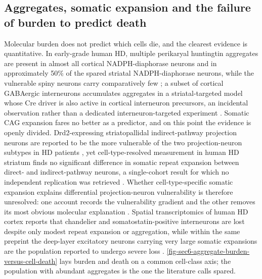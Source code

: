 \documentclass[11pt]{article}
\begin{document}
\subsection{Aggregates, somatic expansion and the failure of burden to predict death}
\label{sec-06-aggregates-expansion}

Molecular burden does not predict which cells die, and the clearest evidence is quantitative. In early-grade human HD, multiple perikaryal huntingtin aggregates are present in almost all cortical NADPH-diaphorase neurons and in approximately 50\% of the spared striatal NADPH-diaphorase neurons, while the vulnerable spiny neurons carry comparatively few \citep{Kuemmerle1999}; a subset of cortical GABAergic interneurons accumulates aggregates in a striatal-targeted model whose Cre driver is also active in cortical interneuron precursors, an incidental observation rather than a dedicated interneuron-targeted experiment \citep{Gu2007}. Somatic CAG expansion fares no better as a predictor, and on this point the evidence is openly divided. Drd2-expressing striatopallidal indirect-pathway projection neurons are reported to be the more vulnerable of the two projection-neuron subtypes in HD patients \citep{Lee2020}, yet cell-type-resolved measurement in human HD striatum finds no significant difference in somatic repeat expansion between direct- and indirect-pathway neurons, a single-cohort result for which no independent replication was retrieved \citep{Matlik2024}. Whether cell-type-specific somatic expansion explains differential projection-neuron vulnerability is therefore unresolved: one account records the vulnerability gradient \citep{Lee2020} and the other removes its most obvious molecular explanation \citep{Matlik2024}. Spatial transcriptomics of human HD cortex reports that chandelier and somatostatin-positive interneurons are lost despite only modest repeat expansion or aggregation, while within the same preprint the deep-layer excitatory neurons carrying very large somatic expansions are the population reported to undergo severe loss \citep{VazquezSanchez2025}. \ref{fig-sec6-aggregate-burden-versus-cell-death} lays burden and death on a common cell-class axis; the population with abundant aggregates is the one the literature calls spared.
\end{document}
